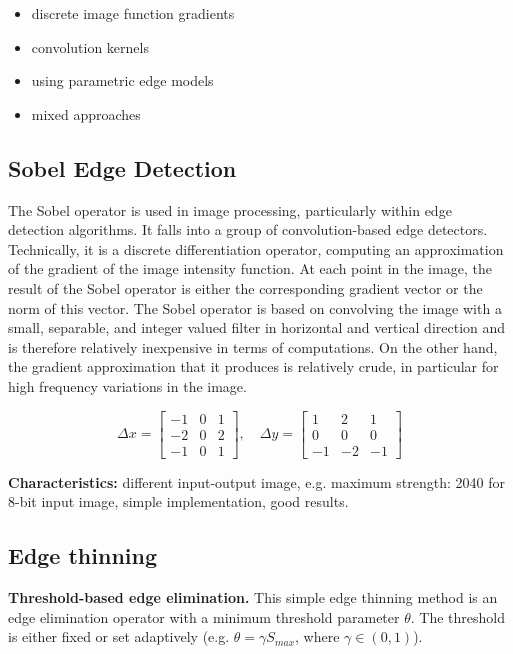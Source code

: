 \documentclass[letterpaper,12pt]{article}
\begin{document}
\begin{itemize}
	\item discrete image function gradients
	\item convolution kernels
 	\item using parametric edge models
 	\item mixed approaches

\end{itemize}


\subsection{Sobel Edge Detection}

The Sobel operator is used in image processing, particularly within edge detection algorithms. It falls into a group of convolution-based edge detectors. Technically, it is a discrete differentiation operator, computing an approximation of the gradient of the image intensity function. At each point in the image, the result of the Sobel operator is either the corresponding gradient vector or the norm of this vector. The Sobel operator is based on convolving the image with a small, separable, and integer valued filter in horizontal and vertical direction and is therefore relatively inexpensive in terms of computations. On the other hand, the gradient approximation that it produces is relatively crude, in particular for high frequency variations in the image.

\[	
  	\Delta x = \begin{bmatrix}
  	-1 & 0 & 1 \\
  	-2 & 0 & 2 \\
  	-1 & 0 & 1
	\end{bmatrix}, \quad
	\Delta y = \begin{bmatrix}
  	1 & 2 & 1 \\
  	0 & 0 & 0 \\
  	-1 & -2 & -1
	\end{bmatrix}
\]

\textbf{Characteristics:} different input-output image, e.g. maximum strength: 2040 for 8-bit input image, simple implementation, good results.


\subsection{Edge thinning}

\textbf{Threshold-based edge elimination.} This simple edge thinning method is an edge elimination operator with a minimum threshold parameter $\theta$. The threshold is either fixed or set adaptively (e.g. $\theta = \gamma S_{max}$, where $ \gamma \in(0,1)$).
\end{document}
